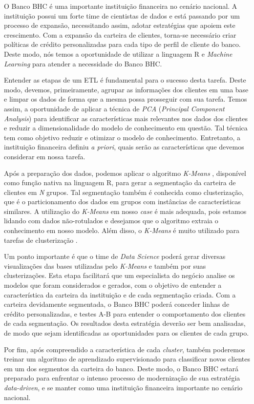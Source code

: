 O Banco BHC é uma importante instituição financeira no cenário nacional. A instituição possui um forte time de cientistas de dados e está passando por um processo de expansão, necessitando assim, adotar estratégias que apoiem este crescimento. Com a expansão da carteira de clientes, torna-se necessário criar políticas de crédito personalizadas para cada tipo de perfil de cliente do banco. Deste modo, nós temos a oportunidade de utilizar a linguagem R \cite{team2000r} e \textit{Machine Learning} \cite{mitchell1997machine} para atender a necessidade do Banco BHC.

Entender as etapas de um ETL \cite{vassiliadis2002conceptual} é fundamental para o sucesso desta tarefa. Deste modo, devemos, primeiramente, agrupar as informações dos clientes em uma base e limpar os dados de forma que a mesma possa prosseguir com sua tarefa. Temos assim, a oportunidade de aplicar a técnica de \textit{PCA} (\textit{Principal Component Analysis}) \cite{mackiewicz1993principal} para identificar as características mais relevantes nos dados dos clientes e reduzir a dimensionalidade do modelo de conhecimento em questão. Tal técnica tem como objetivo reduzir e otimizar o modelo de conhecimento. Entretanto, a instituição financeira definiu \textit{a priori}, quais serão as características que devemos considerar em nossa tarefa.

Após a preparação dos dados, podemos aplicar o algoritmo \textit{K-Means} \cite{hamerly2004learning}, disponível como função nativa na linguagem R, para gerar a segmentação da carteira de clientes em \textit{N} grupos. Tal segmentação também é conhecida como clusterização, que é o particionamento dos dados em grupos com instâncias de características similares. A utilização do \textit{K-Means} em nosso \textit{case} é mais adequada, pois estamos lidando com dados não-rotulados e desejamos que o algoritmo extraia o conhecimento em nosso modelo. Além disso, o \textit{K-Means} é muito utilizado para tarefas de clusterização \cite{burkardt2009k}.

Um ponto importante é que o time de \textit{Data Science} poderá gerar diversas visualizações das bases utilizadas pelo \textit{K-Means} e também por suas clusterizações. Esta etapa facilitará que um especialista do negócio analise os modelos que foram considerados e gerados, com o objetivo de entender a característica da carteira da instituição e de cada segmentação criada. Com a carteira devidamente segmentada, o Banco BHC poderá conceder linhas de crédito personalizadas, e testes A-B para entender o comportamento dos clientes de cada segmentação. Os resultados desta estratégia deverão ser bem analisadas, de modo que sejam identificadas as oportunidades para os clientes de cada grupo.

Por fim, após compreendido a característica de cada \textit{cluster}, também poderemos treinar um algoritmo de aprendizado supervisionado para classificar novos clientes em um dos segmentos da carteira do banco. Deste modo, o Banco BHC estará preparado para enfrentar o intenso processo de modernização de sua estratégia \textit{data-driven}, e se manter como uma instituição financeira importante no cenário nacional.